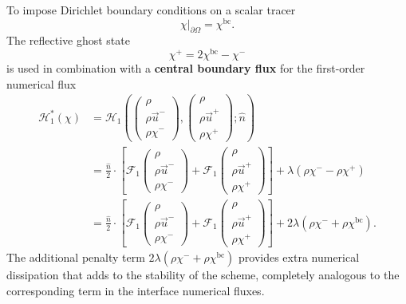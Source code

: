 \documentclass{report}
\numberwithin{equation}{section}
\begin{document}
To impose Dirichlet boundary conditions on a scalar tracer 
\begin{equation}
    \chi\bigg|_{\partial \Omega} = \chi^{\text{bc}}.
\end{equation} 
The reflective ghost state
\begin{equation}
    \chi^+ = 2\chi^{\text{bc}} - \chi^-
\end{equation}
is used in combination with a \textbf{central boundary flux} for the first-order numerical flux
\begin{align}
    \mathcal{H}_1^*(\chi) & = \mathcal{H}_1 \left(
        \begin{pmatrix} \rho \\ \rho \vec u^- \\ \rho \chi^- \end{pmatrix},
        \begin{pmatrix} \rho \\ \rho \vec u^+ \\ \rho \chi^+ \end{pmatrix}; 
    \hat n \right) \nonumber \\
    & = \frac{\hat n}{2} \cdot \left[
        \mathcal{F}_1 \begin{pmatrix} \rho \\ \rho \vec u^- \\ \rho \chi^- \end{pmatrix} 
        + \mathcal{F}_1 \begin{pmatrix} \rho \\ \rho \vec u^+ \\ \rho \chi^+ \end{pmatrix} 
    \right] + \lambda (\rho \chi^- - \rho \chi^+) \nonumber \\
    & = \frac{\hat n}{2} \cdot \left[
        \mathcal{F}_1 \begin{pmatrix} \rho \\ \rho \vec u^- \\ \rho \chi^- \end{pmatrix} 
        + \mathcal{F}_1 \begin{pmatrix} \rho \\ \rho \vec u^+ \\ \rho \chi^+ \end{pmatrix} 
    \right] + 2 \lambda (\rho \chi^- + \rho \chi^{\text{bc}}).
\end{align}
The additional penalty term $2 \lambda (\rho \chi^- + \rho \chi^{\text{bc}})$ provides extra numerical dissipation that adds to the stability of the scheme, completely analogous to the corresponding term in the interface numerical fluxes.
\end{document}
